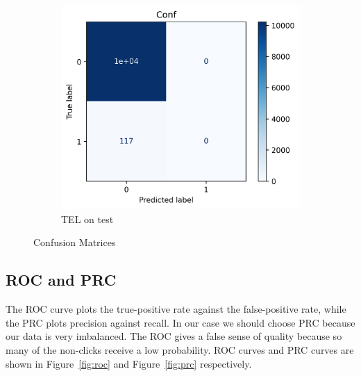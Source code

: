 \documentclass[utf8x]{ctexart}
\begin{document}
\begin{figure}[htb]
\begin{subfigure}[b]{0.32\textwidth}
  \end{subfigure}
  \begin{subfigure}[b]{0.32\textwidth}
    \centering
    \includegraphics[width=\textwidth]{../images/Transformer_test_conf.png}
    \caption{TEL on test}
    \label{fig:Transformer_confusion_test}
  \end{subfigure}

  \caption{Confusion Matrices}
  \label{fig:confusion}
\end{figure}

\subsection{ROC and PRC}

The ROC curve plots the true-positive rate against the false-positive rate, while the PRC plots precision against recall. In our case we should choose PRC because our data is very imbalanced. The ROC gives a false sense of quality because so many of the non-clicks receive a low probability. ROC curves and PRC curves are shown in  Figure~\ref{fig:roc} and Figure~\ref{fig:prc} respectively.
\end{document}
